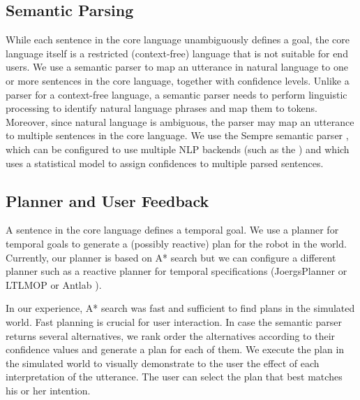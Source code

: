 \subsection{Semantic Parsing}

While each sentence in the core language unambiguously defines a goal, the core language itself is
a restricted (context-free) language that is not suitable for end users. 
We use a semantic parser \cite{CITE,CITE} to map an utterance in natural language to one or more sentences
in the core language, together with confidence levels.
Unlike a parser for a context-free language, a semantic parser needs to perform linguistic processing
to identify natural language phrases and map them to tokens.
Moreover, since natural language is ambiguous, the parser may map an utterance to multiple sentences
in the core language.
We use the Sempre semantic parser \cite{CITE}, which can be configured to use multiple NLP backends (such as
the ) and which uses a statistical model to assign confidences to multiple parsed sentences.

\begin{example}
\end{example}

\subsection{Planner and User Feedback}

A sentence in the core language defines a temporal goal.
We use a planner for temporal goals \cite{Antlab}
to generate a (possibly reactive) plan for the robot in the world.
Currently, our planner is based on A* search \cite{Astar} but we can configure
a different planner such as a reactive planner for temporal specifications
(JoergsPlanner or LTLMOP \cite{LTLMOP} or Antlab \cite{Antlab}).

In our experience, A* search was fast and sufficient to find plans in the simulated world.
Fast planning is crucial for user interaction.
In case the semantic parser returns several alternatives, we rank order the alternatives
according to their confidence values and generate a plan for each of them.
We execute the plan in the simulated world to visually demonstrate to the user the effect of each
interpretation of the utterance.
The user can select the plan that best matches his or her intention. 
 


